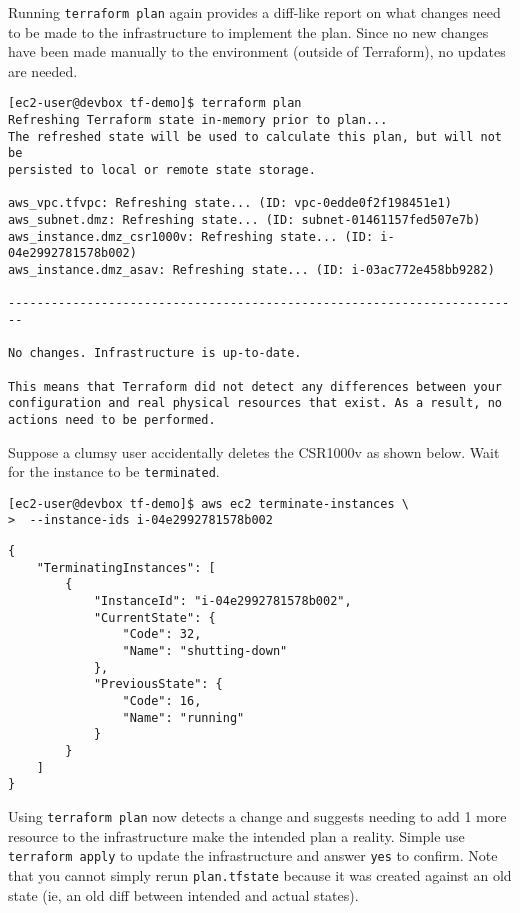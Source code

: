 Running \verb|terraform plan| again provides a diff-like report on what changes
need to be made to the infrastructure to implement the plan. Since no new
changes have been made manually to the environment (outside of Terraform), no
updates are needed.

\begin{verbatim}
[ec2-user@devbox tf-demo]$ terraform plan
Refreshing Terraform state in-memory prior to plan...
The refreshed state will be used to calculate this plan, but will not be
persisted to local or remote state storage.

aws_vpc.tfvpc: Refreshing state... (ID: vpc-0edde0f2f198451e1)
aws_subnet.dmz: Refreshing state... (ID: subnet-01461157fed507e7b)
aws_instance.dmz_csr1000v: Refreshing state... (ID: i-04e2992781578b002)
aws_instance.dmz_asav: Refreshing state... (ID: i-03ac772e458bb9282)

------------------------------------------------------------------------

No changes. Infrastructure is up-to-date.

This means that Terraform did not detect any differences between your
configuration and real physical resources that exist. As a result, no
actions need to be performed.
\end{verbatim}

Suppose a clumsy user accidentally deletes the CSR1000v as shown below. Wait
for the instance to be \verb|terminated|.

\begin{verbatim}
[ec2-user@devbox tf-demo]$ aws ec2 terminate-instances \
>  --instance-ids i-04e2992781578b002
\end{verbatim}

\begin{verbatim}
{
    "TerminatingInstances": [
        {
            "InstanceId": "i-04e2992781578b002",
            "CurrentState": {
                "Code": 32,
                "Name": "shutting-down"
            },
            "PreviousState": {
                "Code": 16,
                "Name": "running"
            }
        }
    ]
}
\end{verbatim}

Using \verb|terraform plan| now detects a change and suggests needing to add 1 more
resource to the infrastructure make the intended plan a reality. Simple use
\verb|terraform apply| to update the infrastructure and answer \verb|yes| to confirm.
Note that you cannot simply rerun \verb|plan.tfstate| because it was created
against an old state (ie, an old diff between intended and actual states).


